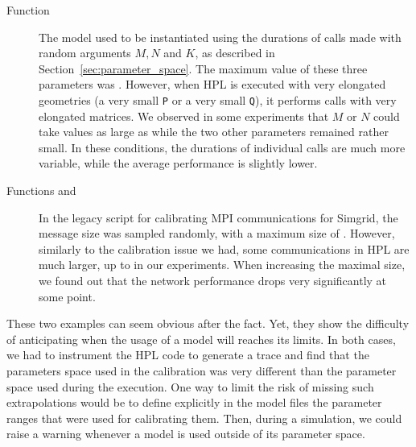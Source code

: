         \begin{description}
            \item[Function \dgemm] The model used to be instantiated using the durations of \dgemm calls made with
                random arguments \(M,N\) and \(K\), as described in Section~\ref{sec:parameter_space}. The maximum value
                of these three parameters was . However, when HPL is executed with very elongated
                geometries (\eg a very small \texttt{P} or a very small \texttt{Q}), it performs \dgemm calls with very
                elongated matrices. We observed in some experiments that \(M\) or \(N\) could take values as large as
                 while the two other parameters remained rather small. In these conditions, the durations of
                individual \dgemm calls are much more variable, while the average performance is slightly lower.
            \item[Functions \recv and \send] In the legacy script for calibrating MPI communications for Simgrid, the
                message size was sampled randomly, with a maximum size of . However, similarly to the
                \dgemm calibration issue we had, some communications in HPL are much larger, up to 
                in our experiments. When increasing the maximal size, we found out that the network performance drops
                very significantly at some point.
        \end{description}

        These two examples can seem obvious after the fact. Yet, they show the difficulty of anticipating when the usage
        of a model will reaches its limits. In both cases, we had to instrument the HPL code to generate a trace and
        find that the parameters space used in the calibration was very different than the parameter space used during
        the execution. One way to limit the risk of missing such extrapolations would be to define explicitly in the
        model files the parameter ranges that were used for calibrating them. Then, during a simulation, we could raise
        a warning whenever a model is used outside of its parameter space.


